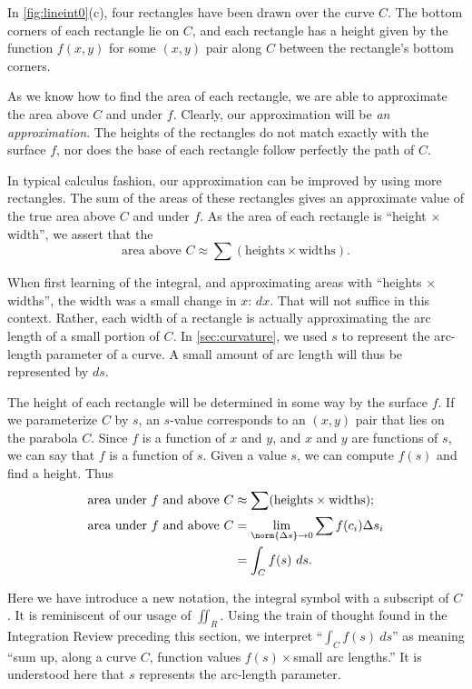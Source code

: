 In \autoref{fig:lineint0}(c), four rectangles have been drawn over the curve $C$. The bottom corners of each rectangle lie on $C$, and each rectangle has a height given by the function $f(x,y)$ for some $(x,y)$ pair along $C$ between the rectangle's bottom corners. 

As we know how to find the area of each rectangle, we are able to approximate the area above $C$ and under $f$. Clearly, our approximation will be \textit{an approximation}. The heights of the rectangles do not match exactly with the surface $f$, nor does the base of each rectangle follow perfectly the path of $C$.

In typical calculus fashion, our approximation can be improved by using more rectangles. The sum of the areas of these rectangles gives an approximate value of the true area above $C$ and under $f$. As the area of each rectangle is ``height $\times$ width'', we assert that the
\[\text{area above $C$}\approx \sum (\text{heights}\times\text{widths}).\]

When first learning of the integral, and approximating areas with ``heights $\times$ widths'', the width was a small change in $x$: $dx$. That will not suffice in this context. Rather, each width of a rectangle is actually approximating the arc length of a small portion of $C$. In \autoref{sec:curvature}, we used $s$ to represent the arc-length parameter of a curve. A small amount of arc length will thus be represented by $ds$. 

The height of each rectangle will be determined in some way by the surface $f$. If we parameterize $C$ by $s$, an $s$-value corresponds to an $(x,y)$ pair that lies on the parabola $C$. Since $f$ is a function of $x$ and $y$, and $x$ and $y$ are functions of $s$, we can say that $f$ is a function of $s$. Given a value $s$, we can compute $f(s)$ and find a height. Thus
\begin{align}
	\text{area under $f$ and above $C$}
	&\approx \sum (\text{heights}\times\text{widths});\notag\\
	\text{area under $f$ and above $C$}
	&=\lim_{\norm{\Delta s}\to0}\sum f(c_i)\Delta s_i\notag\\
	&=\int_Cf(s)\ ds.\label{eq:line0}
\end{align}

Here we have introduce a new notation, the integral symbol with a subscript of $C$. It is reminiscent of our usage of $\iint_R$. Using the train of thought found in the Integration Review preceding this section, we interpret ``$\int_C f(s)\ ds$'' as meaning ``sum up, along a curve $C$, function values $f(s)\times$small arc lengths.'' It is understood here that $s$ represents the arc-length parameter.

